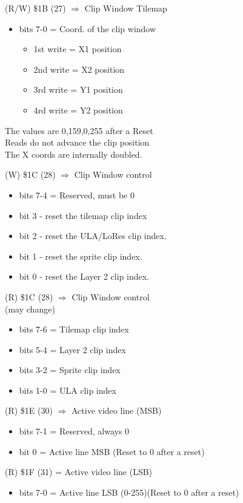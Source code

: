 (R/W) \$1B (27) $\Rightarrow$ Clip Window Tilemap
\begin{itemize}
\item[] bits 7-0 = Coord. of the clip window
  \begin{itemize}
  \item[] 1st write = X1 position
  \item[] 2nd write = X2 position
  \item[] 3rd write = Y1 position
  \item[] 4rd write = Y2 position
  \end{itemize}
\end{itemize}
The values are 0,159,0,255 after a Reset\\
Reads do not advance the clip position\\
The X coords are internally doubled.

(W) \$1C (28) $\Rightarrow$ Clip Window control
\begin{itemize}
\item[] bits 7-4 = Reserved, must be 0
\item[] bit 3 - reset the tilemap clip index
\item[] bit 2 - reset the ULA/LoRes clip index.
\item[] bit 1 - reset the sprite clip index.
\item[] bit 0 - reset the Layer 2 clip index.
\end{itemize}

(R) \$1C (28) $\Rightarrow$ Clip Window control\\
(may change)
\begin{itemize}
\item[] bits 7-6 = Tilemap clip index
\item[] bits 5-4 = Layer 2 clip index
\item[] bits 3-2 = Sprite clip index
\item[] bits 1-0 = ULA clip index
\end{itemize}

(R) \$1E (30) $\Rightarrow$ Active video line (MSB)
\begin{itemize}
\item[] bits 7-1 = Reserved, always 0
\item[] bit 0 = Active line MSB (Reset to 0 after a reset)
\end{itemize}

(R) \$1F (31) = Active video line (LSB)
\begin{itemize}
\item[] bits 7-0 = Active line LSB (0-255)(Reset to 0 after a reset)
\end{itemize}

